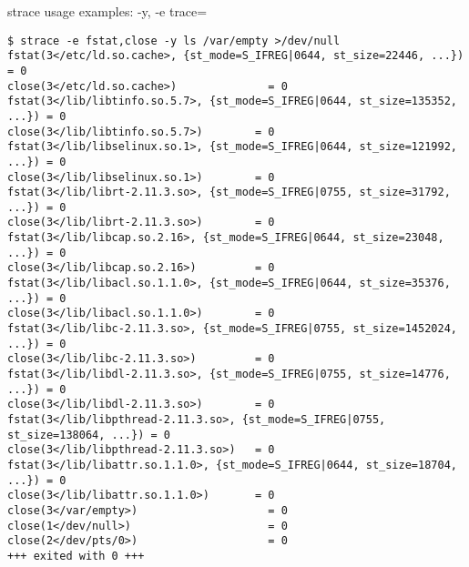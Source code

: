 \begin{frame}[fragile]{strace usage examples: -y, -e trace=}
\scriptsize
\begin{verbatim}
$ strace -e fstat,close -y ls /var/empty >/dev/null
fstat(3</etc/ld.so.cache>, {st_mode=S_IFREG|0644, st_size=22446, ...}) = 0
close(3</etc/ld.so.cache>)              = 0
fstat(3</lib/libtinfo.so.5.7>, {st_mode=S_IFREG|0644, st_size=135352, ...}) = 0
close(3</lib/libtinfo.so.5.7>)        = 0
fstat(3</lib/libselinux.so.1>, {st_mode=S_IFREG|0644, st_size=121992, ...}) = 0
close(3</lib/libselinux.so.1>)        = 0
fstat(3</lib/librt-2.11.3.so>, {st_mode=S_IFREG|0755, st_size=31792, ...}) = 0
close(3</lib/librt-2.11.3.so>)        = 0
fstat(3</lib/libcap.so.2.16>, {st_mode=S_IFREG|0644, st_size=23048, ...}) = 0
close(3</lib/libcap.so.2.16>)         = 0
fstat(3</lib/libacl.so.1.1.0>, {st_mode=S_IFREG|0644, st_size=35376, ...}) = 0
close(3</lib/libacl.so.1.1.0>)        = 0
fstat(3</lib/libc-2.11.3.so>, {st_mode=S_IFREG|0755, st_size=1452024, ...}) = 0
close(3</lib/libc-2.11.3.so>)         = 0
fstat(3</lib/libdl-2.11.3.so>, {st_mode=S_IFREG|0755, st_size=14776, ...}) = 0
close(3</lib/libdl-2.11.3.so>)        = 0
fstat(3</lib/libpthread-2.11.3.so>, {st_mode=S_IFREG|0755, st_size=138064, ...}) = 0
close(3</lib/libpthread-2.11.3.so>)   = 0
fstat(3</lib/libattr.so.1.1.0>, {st_mode=S_IFREG|0644, st_size=18704, ...}) = 0
close(3</lib/libattr.so.1.1.0>)       = 0
close(3</var/empty>)                    = 0
close(1</dev/null>)                     = 0
close(2</dev/pts/0>)                    = 0
+++ exited with 0 +++
\end{verbatim}
\end{frame}

